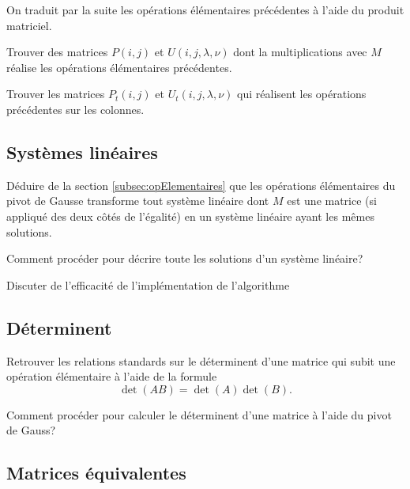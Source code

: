 \documentclass[11pt, a4paper]{article}
\begin{document}
On traduit par la suite les opérations élémentaires précédentes à
l'aide du produit matriciel.
\begin{question}
  Trouver des matrices $P(i, j)$ et $U(i, j, \lambda, \nu)$ dont la
  multiplications avec $M$ réalise les opérations élémentaires
  précédentes.
\end{question}

\begin{question}
  Trouver les matrices $P_t(i, j)$ et $U_t(i, j, \lambda, \nu)$ qui
  réalisent les opérations précédentes sur les colonnes.
\end{question}

\subsection{Systèmes linéaires}

\begin{question}
  Déduire de la section \ref{subsec:opElementaires} que les opérations
  élémentaires du pivot de Gausse transforme tout système linéaire
  dont $M$ est une matrice (si appliqué des deux côtés de l'égalité)
  en un système linéaire ayant les mêmes solutions.
\end{question}

\begin{question}
  Comment procéder pour décrire toute les solutions d'un système
  linéaire?
\end{question}

\begin{question}
  Discuter de l'efficacité de l'implémentation de l'algorithme
\end{question}

\subsection{Déterminent}

\begin{question}
  Retrouver les relations standards sur le déterminent d'une matrice
  qui subit une opération élémentaire à l'aide de la formule
  \[
  \det(AB) = \det(A)\det(B).
  \]
\end{question}

\begin{question}
  Comment procéder pour calculer le déterminent d'une matrice à l'aide
  du pivot de Gauss?
\end{question}

\subsection{Matrices équivalentes}
\end{document}
